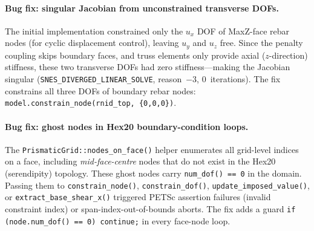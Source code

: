 \paragraph{Bug fix: singular Jacobian from unconstrained transverse DOFs.}
The initial implementation constrained only the $u_x$ DOF of
MaxZ-face rebar nodes (for cyclic displacement control), leaving
$u_y$ and $u_z$ free.  Since the penalty coupling skips boundary
faces, and truss elements only provide axial ($z$-direction)
stiffness, these two transverse DOFs had zero stiffness---making the
Jacobian singular (\texttt{SNES\_DIVERGED\_LINEAR\_SOLVE}, reason~$-3$,
0~iterations).  The fix constrains all three DOFs of boundary rebar
nodes:
\texttt{model.constrain\_node(rnid\_top, \{0,0,0\})}.

\paragraph{Bug fix: ghost nodes in Hex20 boundary-condition loops.}
The \texttt{PrismaticGrid::nodes\_on\_face()} helper enumerates all
grid-level indices on a face, including \emph{mid-face-centre}
nodes that do not exist in the Hex20 (serendipity) topology.
These ghost nodes carry \texttt{num\_dof() == 0} in the domain.
Passing them to \texttt{constrain\_node()}, \texttt{constrain\_dof()},
\texttt{update\_imposed\_value()}, or \texttt{extract\_base\_shear\_x()}
triggered PETSc assertion failures (invalid constraint index) or
span-index-out-of-bounds aborts.
The fix adds a guard \texttt{if (node.num\_dof() == 0) continue;}
in every face-node loop.


